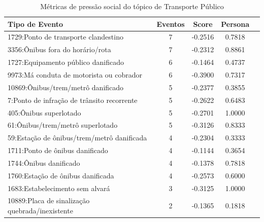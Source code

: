 \begin{table}[htbp]
	\centering
	\caption{Métricas de pressão social do tópico de Transporte Público}
	\label{tab:eventos_populares_busfare}
	\begin{tabular}{|l|c|c|c|c|}
		\hline
		\textbf{Tipo de Evento}                              & \textbf{Eventos} & \textbf{Score} & \textbf{Persona} \\
		\hline
		1729:Ponto de transporte clandestino                 & 7                & -0.2516        & 0.7818           \\
		\hline
		3356:Ônibus fora do horário/rota                     & 7                & -0.2312        & 0.8861           \\
		\hline
		1727:Equipamento público danificado                  & 6                & -0.1464        & 0.4737           \\
		\hline
		9973:Má conduta de motorista ou cobrador             & 6                & -0.3900        & 0.7317           \\
		\hline
		10869:Ônibus/trem/metrô danificado                   & 5                & -0.2377        & 0.3855           \\
		\hline
		7:Ponto de infração de trânsito recorrente           & 5                & -0.2622        & 0.6483           \\
		\hline
		405:Ônibus superlotado                               & 5                & -0.2701        & 1.0000           \\
		\hline
		61:Ônibus/trem/metrô superlotado                     & 5                & -0.3126        & 0.8333           \\
		\hline
		59:Estação de ônibus/trem/metrô danificada           & 4                & -0.2304        & 0.3333           \\
		\hline
		1711:Ponto de ônibus danificado                      & 4                & -0.1144        & 0.3654           \\
		\hline
		1744:Ônibus danificado                               & 4                & -0.1378        & 0.7818           \\
		\hline
		1760:Estação de ônibus danificada                    & 4                & -0.2573        & 0.6000           \\
		\hline
		1683:Estabelecimento sem alvará                      & 3                & -0.3125        & 1.0000           \\
		\hline
		10889:Placa de sinalização quebrada/inexistente      & 2                & -0.1365        & 0.1818           \\

\end{tabular}
\end{table}
